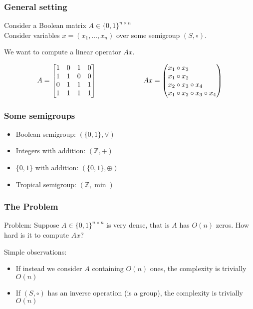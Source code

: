 \documentclass{beamer}
\newcommand{\para}[1]{{\color{blue}#1}}
\begin{document}
\begin{frame}
\frametitle{General setting}

Consider a Boolean matrix $A \in \{0,1\}^{n\times n}$\\
Consider variables $x = (x_1,\ldots, x_n)$ over some semigroup $(S, \circ)$.

\medskip
We want to compute a linear operator $A x$.

\medskip

\[
  A =\begin{bmatrix}
    1 & 0 & 1 & 0 \\
    1 & 1 & 0 & 0 \\
    0 & 1 & 1 & 1 \\
    1 & 1 & 1 & 1 \\
  \end{bmatrix}
 \ \ \ \ \ \ \ \ \ \ \ \ \ \ \ \ \ \ \ \ Ax = \left(\begin{array}{@{}l@{}}
    x_1 \circ x_3 \\
    x_1 \circ x_2 \\
    x_2 \circ x_3 \circ x_4 \\
    x_1 \circ x_2 \circ x_3 \circ x_4\\
  \end{array}\right)
  \]

\end{frame}


\begin{frame}
\frametitle{Some semigroups}

\begin{itemize}%
\item Boolean semigroup: $(\{0,1\}, \vee)$
\item Integers with addition: $(\mathbb{Z}, +)$
\item $\{0,1\}$ with addition: $(\{0,1\}, \oplus)$
\item Tropical semigroup: $(\mathbb{Z}, \min)$

\end{itemize}


\end{frame}


\begin{frame}
\frametitle{The Problem}

\para{Problem:} Suppose $A \in \{0,1\}^{n\times n}$ is very dense, that is $A$ has $O(n)$ zeros. How hard is it to compute $Ax$?

\pause
\medskip
Simple observations:
\begin{itemize}[<+->]
\item If instead we consider $A$ containing $O(n)$ ones, the complexity is trivially $O(n)$
\item If $(S,\circ)$ has an inverse operation (is a group), the complexity is trivially $O(n)$
\end{itemize}



\end{frame}
\end{document}
